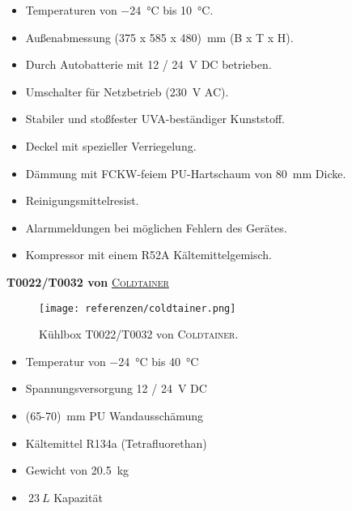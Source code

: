 \begin{itemize}
    \item Temperaturen von \SI{-24}{\celsius} bis \SI{10}{\celsius}.
    \item Außenabmessung \SI{(375 x 585 x 480)}{mm} (B x T x H).
    \item Durch Autobatterie mit 12 / \SI{24}{V} DC betrieben.
    \item Umschalter für Netzbetrieb (\SI{230}{V} AC).
    \item Stabiler und stoßfester UVA-beständiger Kunststoff.
    \item Deckel mit spezieller Verriegelung.
    \item Dämmung mit FCKW-feiem PU-Hartschaum von \SI{80}{mm} Dicke.
    \item Reinigungsmittelresist.
    \item Alarmmeldungen bei möglichen Fehlern des Gerätes.
    \item Kompressor mit einem R52A Kältemittelgemisch.
\end{itemize}

\newpage
\textbf{T0022/T0032 von} \href{https://coldtainerusa.com/wp-content/uploads/2020/03/Product_Info_T0022-T0032_US_ColdtainerUSA-1.pdf}{\textsc{Coldtainer}}
\begin{figure}[H] %
    \centering
    \texttt{[image: referenzen/coldtainer.png]}
    \caption{Kühlbox T0022/T0032 von \textsc{Coldtainer}.}
\end{figure}
\begin{itemize}
    \item Temperatur von \SI{-24}{\celsius} bis \SI{40}{\celsius}
    \item Spannungsversorgung 12 / \SI{24}{V} DC %
    \item \SI{(65-70)}{mm} PU Wandausschämung
    \item Kältemittel R134a (Tetrafluorethan)
    \item Gewicht von \SI{20,5}{kg}
    \item \(~ \SI{23}{L}\) Kapazität
\end{itemize}